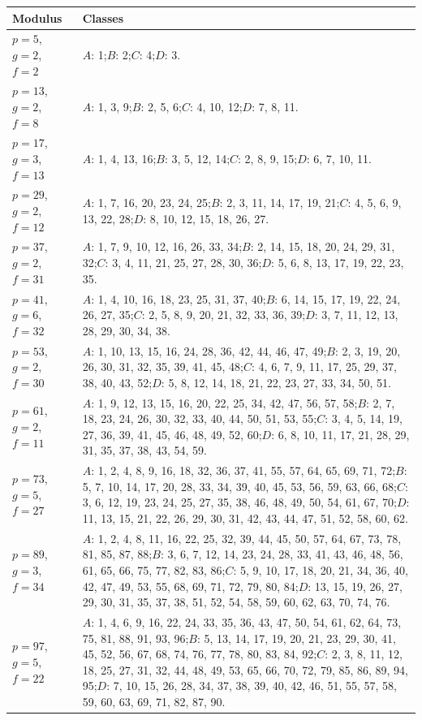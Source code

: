 \documentclass[12pt]{article}
\begin{document}
\begin{longtable}{>{\raggedright\arraybackslash}p{}p{}}
\toprule
Modulus & Classes\\
\midrule
$p=5$, $g=2$, $f=2$ &
$A$: 1;\quad $B$: 2;\quad $C$: 4;\quad $D$: 3.\\[2pt]
$p=13$, $g=2$, $f=8$ &
$A$: 1, 3, 9;\quad $B$: 2, 5, 6;\quad $C$: 4, 10, 12;\quad $D$: 7, 8, 11.\\[2pt]
$p=17$, $g=3$, $f=13$ &
$A$: 1, 4, 13, 16;\quad $B$: 3, 5, 12, 14;\quad $C$: 2, 8, 9, 15;\quad $D$: 6, 7, 10, 11.\\[2pt]
$p=29$, $g=2$, $f=12$ &
$A$: 1, 7, 16, 20, 23, 24, 25;\quad $B$: 2, 3, 11, 14, 17, 19, 21;\quad $C$: 4, 5, 6, 9, 13, 22, 28;\quad $D$: 8, 10, 12, 15, 18, 26, 27.\\[2pt]
$p=37$, $g=2$, $f=31$ &
$A$: 1, 7, 9, 10, 12, 16, 26, 33, 34;\quad $B$: 2, 14, 15, 18, 20, 24, 29, 31, 32;\quad $C$: 3, 4, 11, 21, 25, 27, 28, 30, 36;\quad $D$: 5, 6, 8, 13, 17, 19, 22, 23, 35.\\[2pt]
$p=41$, $g=6$, $f=32$ &
$A$: 1, 4, 10, 16, 18, 23, 25, 31, 37, 40;\quad $B$: 6, 14, 15, 17, 19, 22, 24, 26, 27, 35;\quad $C$: 2, 5, 8, 9, 20, 21, 32, 33, 36, 39;\quad $D$: 3, 7, 11, 12, 13, 28, 29, 30, 34, 38.\\[2pt]
$p=53$, $g=2$, $f=30$ &
$A$: 1, 10, 13, 15, 16, 24, 28, 36, 42, 44, 46, 47, 49;\quad $B$: 2, 3, 19, 20, 26, 30, 31, 32, 35, 39, 41, 45, 48;\quad $C$: 4, 6, 7, 9, 11, 17, 25, 29, 37, 38, 40, 43, 52;\quad $D$: 5, 8, 12, 14, 18, 21, 22, 23, 27, 33, 34, 50, 51.\\[2pt]
$p=61$, $g=2$, $f=11$ &
$A$: 1, 9, 12, 13, 15, 16, 20, 22, 25, 34, 42, 47, 56, 57, 58;\quad $B$: 2, 7, 18, 23, 24, 26, 30, 32, 33, 40, 44, 50, 51, 53, 55;\quad $C$: 3, 4, 5, 14, 19, 27, 36, 39, 41, 45, 46, 48, 49, 52, 60;\quad $D$: 6, 8, 10, 11, 17, 21, 28, 29, 31, 35, 37, 38, 43, 54, 59.\\[2pt]
$p=73$, $g=5$, $f=27$ &
$A$: 1, 2, 4, 8, 9, 16, 18, 32, 36, 37, 41, 55, 57, 64, 65, 69, 71, 72;\quad $B$: 5, 7, 10, 14, 17, 20, 28, 33, 34, 39, 40, 45, 53, 56, 59, 63, 66, 68;\quad $C$: 3, 6, 12, 19, 23, 24, 25, 27, 35, 38, 46, 48, 49, 50, 54, 61, 67, 70;\quad $D$: 11, 13, 15, 21, 22, 26, 29, 30, 31, 42, 43, 44, 47, 51, 52, 58, 60, 62.\\[2pt]
$p=89$, $g=3$, $f=34$ &
$A$: 1, 2, 4, 8, 11, 16, 22, 25, 32, 39, 44, 45, 50, 57, 64, 67, 73, 78, 81, 85, 87, 88;\quad $B$: 3, 6, 7, 12, 14, 23, 24, 28, 33, 41, 43, 46, 48, 56, 61, 65, 66, 75, 77, 82, 83, 86;\quad $C$: 5, 9, 10, 17, 18, 20, 21, 34, 36, 40, 42, 47, 49, 53, 55, 68, 69, 71, 72, 79, 80, 84;\quad $D$: 13, 15, 19, 26, 27, 29, 30, 31, 35, 37, 38, 51, 52, 54, 58, 59, 60, 62, 63, 70, 74, 76.\\[2pt]
$p=97$, $g=5$, $f=22$ &
$A$: 1, 4, 6, 9, 16, 22, 24, 33, 35, 36, 43, 47, 50, 54, 61, 62, 64, 73, 75, 81, 88, 91, 93, 96;\quad $B$: 5, 13, 14, 17, 19, 20, 21, 23, 29, 30, 41, 45, 52, 56, 67, 68, 74, 76, 77, 78, 80, 83, 84, 92;\quad $C$: 2, 3, 8, 11, 12, 18, 25, 27, 31, 32, 44, 48, 49, 53, 65, 66, 70, 72, 79, 85, 86, 89, 94, 95;\quad $D$: 7, 10, 15, 26, 28, 34, 37, 38, 39, 40, 42, 46, 51, 55, 57, 58, 59, 60, 63, 69, 71, 82, 87, 90.\\
\bottomrule
\end{longtable}
\end{document}
